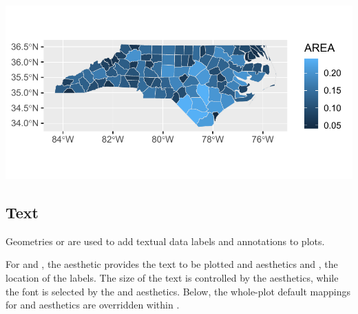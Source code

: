 \documentclass[krantz2]{krantz}\usepackage{knitr}
\begin{document}
\begin{knitrout}\footnotesize
{}\color{fgcolor}\begin{kframe}
\begin{alltt}
 \hlkwb{<-} \hlopt{::}\hlstd{(}\hlstd{(}\hlstd{,}  \hlstd{=} \hlstd{),}  \hlstd{=} \hlstd{)}
 \hlopt{+}
  \hlstd{(} \hlstd{=} \hlstd{(}   \hlstd{=} \hlstd{)}
\end{alltt}
\end{kframe}

{\centering \includegraphics[width=.7\textwidth]{figure/pos-sf_plot-01-1} 

}


\end{knitrout}

\subsection{Text}\label{sec:plot:text}
Geometries  or  are used to add textual data labels and annotations to plots.

For  and , the aesthetic  provides the text to be plotted and aesthetics  and , the location of the labels. The size of the text is controlled by the  aesthetics, while the font is selected by the  and  aesthetics. Below, the whole-plot default mappings for  and  aesthetics are overridden within .
\end{document}
